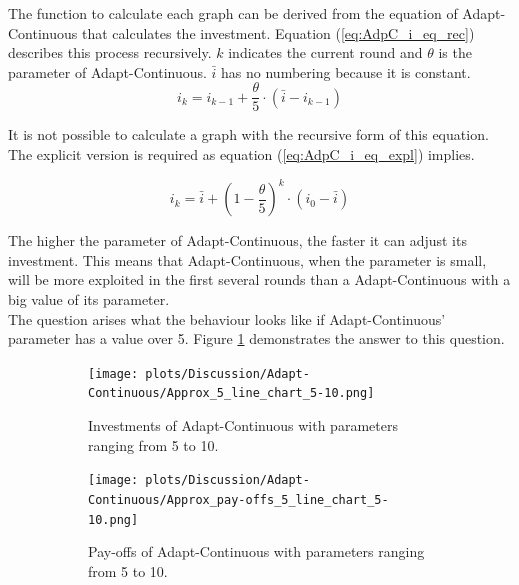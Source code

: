 \documentclass[11pt]{article}
\begin{document}
	The function to calculate each graph can be derived from the equation of Adapt-Continuous that calculates the investment.
	Equation (\ref{eq:AdpC_i_eq_rec}) describes this process recursively.
	$k$ indicates the current round and $\theta$ is the parameter of Adapt-Continuous.
	$\bar i$ has no numbering because it is constant.
	\begin{equation}
		i_k = i_{k-1} + \frac{\theta}{5} \cdot (\bar i - i_{k-1})
		\label{eq:AdpC_i_eq_rec}
	\end{equation}

	It is not possible to calculate a graph with the recursive form of this equation.
	The explicit version is required as equation (\ref{eq:AdpC_i_eq_expl}) implies.

	\begin{equation}
		i_k = \bar i + (1 - \frac{\theta}{5})^k \cdot (i_0 - \bar i)
		\label{eq:AdpC_i_eq_expl}
	\end{equation}
	
	The higher the parameter of Adapt-Continuous, the faster it can adjust its investment.
	This means that Adapt-Continuous, when the parameter is small, will be more exploited in the first several rounds than a Adapt-Continuous with a big value of its parameter.\\
	
	The question arises what the behaviour looks like if Adapt-Continuous' parameter has a value over 5.
	Figure \ref{fig:AdpC_approx_investm_5-10} demonstrates the answer to this question.\\
	\begin{figure}[h!]
		\centering
		\begin{subfigure}[t]{0.45\textwidth}
			\centering
			\texttt{[image: plots/Discussion/Adapt-Continuous/Approx\_5\_line\_chart\_5-10.png]}
			\caption{Investments of Adapt-Continuous with parameters ranging from 5 to 10.}
			\label{fig:AdpC_approx_investm_5-10}
		\end{subfigure}
		\hfill
		\begin{subfigure}[t]{0.45\textwidth}
			\centering
			\texttt{[image: plots/Discussion/Adapt-Continuous/Approx\_pay-offs\_5\_line\_chart\_5-10.png]}
			\caption{Pay-offs of Adapt-Continuous with parameters ranging from 5 to 10.}
			\label{fig:AdpC_approx_payoff_5-10}
		\end{subfigure}
		\caption{}
		\label{fig:AdpC_approx_invetm_and_payoffs_5-10}
	\end{figure}
	
\end{document}
